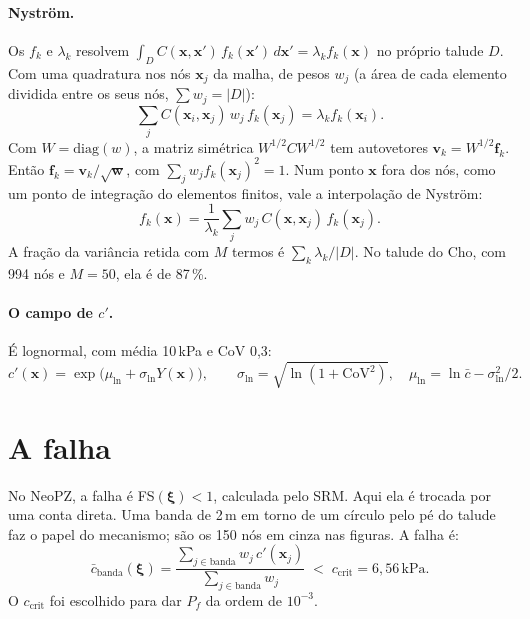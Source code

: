 \documentclass[11pt,a4paper]{article}
\begin{document}
\paragraph{Nyström.} Os $f_k$ e $\lambda_k$ resolvem $\int_D C(\bm x, \bm x')\, f_k(\bm x')\, d\bm x' = \lambda_k
f_k(\bm x)$ no próprio talude $D$. Com uma quadratura nos nós $\bm x_j$ da malha, de pesos $w_j$ (a área de cada
elemento dividida entre os seus nós, $\sum w_j = |D|$):
\[
  \sum_j C(\bm x_i, \bm x_j)\, w_j\, f_k(\bm x_j) = \lambda_k f_k(\bm x_i).
\]
Com $W = \mathrm{diag}(w)$, a matriz simétrica $W^{1/2} C W^{1/2}$ tem autovetores $\bm v_k = W^{1/2} \bm f_k$.
Então $\bm f_k = \bm v_k / \sqrt{\bm w}$, com $\sum_j w_j f_k(\bm x_j)^2 = 1$. Num ponto $\bm x$ fora dos nós, como
um ponto de integração do elementos finitos, vale a interpolação de Nyström:
\[
  f_k(\bm x) = \frac{1}{\lambda_k} \sum_j w_j\, C(\bm x, \bm x_j)\, f_k(\bm x_j).
\]
A fração da variância retida com $M$ termos é $\sum_k \lambda_k / |D|$. No talude do Cho, com 994 nós e $M = 50$, ela é
de 87\,\%.

\paragraph{O campo de $c'$.} É lognormal, com média 10\,kPa e CoV 0,3:
\[
  c'(\bm x) = \exp\!\big(\mu_{\ln} + \sigma_{\ln} Y(\bm x)\big), \qquad
  \sigma_{\ln} = \sqrt{\ln(1 + \mathrm{CoV}^2)}, \quad \mu_{\ln} = \ln \bar c - \sigma_{\ln}^2/2 .
\]

\section{A falha}
No NeoPZ, a falha é FS$(\bm\xi) < 1$, calculada pelo SRM. Aqui ela é trocada por uma conta direta. Uma banda de 2\,m
em torno de um círculo pelo pé do talude faz o papel do mecanismo; são os 150 nós em cinza nas figuras. A falha é:
\[
  \bar c_{\text{banda}}(\bm\xi) = \frac{\sum_{j \in \text{banda}} w_j\, c'(\bm x_j)}{\sum_{j \in \text{banda}} w_j}
  \; < \; c_{\text{crit}} = 6{,}56\,\text{kPa}.
\]
O $c_{\text{crit}}$ foi escolhido para dar $P_f$ da ordem de $10^{-3}$.
\end{document}
